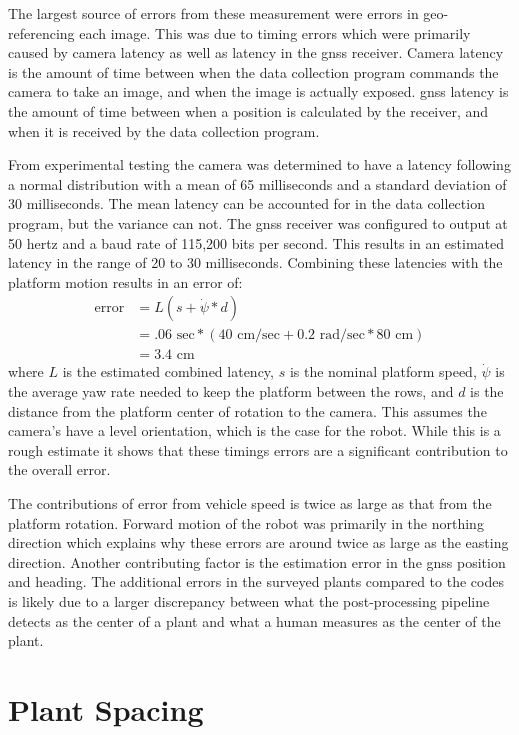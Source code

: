 The largest source of errors from these measurement were errors in geo-referencing each image.  This was due to timing errors which were primarily caused by camera latency as well as latency in the \ac{gnss} receiver.  Camera latency is the amount of time between when the data collection program commands the camera to take an image, and when the image is actually exposed.  \ac{gnss} latency is the amount of time between when a position is calculated by the receiver, and when it is received by the data collection program. 

From experimental testing the camera was determined to have a latency following a normal distribution with a mean of 65 milliseconds and a standard deviation of 30 milliseconds.  The mean latency can be accounted for in the data collection program, but the variance can not. The \ac{gnss} receiver was configured to output at 50 hertz and a baud rate of 115,200 bits per second.  This results in an estimated latency in the range of 20 to 30 milliseconds.  Combining these latencies with the platform motion results in an error of:
\begin{align*}
 \text{error} &= L (s + \dot{\psi}*d) \\
             &= .06 \text{ sec}* (40\text{ cm/sec} + 0.2 \text{ rad/sec} * 80 \text{ cm}) \\ 
             &= 3.4 \text{ cm}
\end{align*}
where $L$ is the estimated combined latency, $s$ is the nominal platform speed, $\dot{\psi}$ is the average yaw rate needed to keep the platform between the rows, and $d$ is the distance from the platform center of rotation to the camera.  This assumes the camera's have a level orientation, which is the case for the robot.  While this is a rough estimate it shows that these timings errors are a significant contribution to the overall error.

The contributions of error from vehicle speed is twice as large as that from the platform rotation. Forward motion of the robot was primarily in the northing direction which explains why these errors are around twice as large as the easting direction.  Another contributing factor is the estimation error in the \ac{gnss} position and heading.  The additional errors in the surveyed plants compared to the codes is likely due to a larger discrepancy between what the post-processing pipeline detects as the center of a plant and what a human measures as the center of the plant. 

\section{Plant Spacing}

